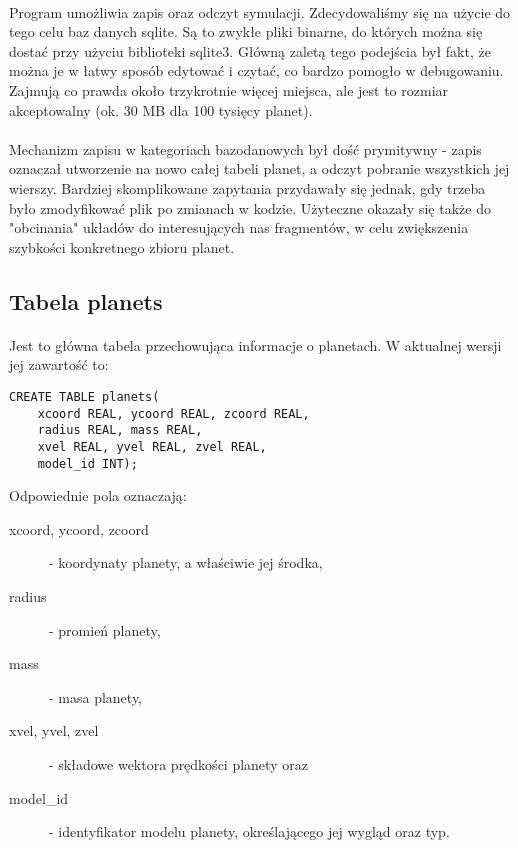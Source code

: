 \paragraph{}
Program umożliwia zapis oraz odczyt symulacji. Zdecydowaliśmy się na użycie do tego celu baz danych sqlite. Są to zwykłe pliki binarne, do których można się dostać przy użyciu biblioteki sqlite3\cite{sqlite3}. Główną zaletą tego podejścia był fakt, że można je w łatwy sposób edytować i czytać, co bardzo pomogło w debugowaniu. Zajmują co prawda około trzykrotnie więcej miejsca, ale jest to rozmiar akceptowalny (ok. 30 MB dla 100 tysięcy planet).

\paragraph{}
Mechanizm zapisu w kategoriach bazodanowych był dość prymitywny - zapis oznaczał utworzenie na nowo całej tabeli planet, a odczyt pobranie wszystkich jej wierszy. Bardziej skomplikowane zapytania przydawały się jednak, gdy trzeba było zmodyfikować plik po zmianach w kodzie. Użyteczne okazały się także do "obcinania" układów do interesujących nas fragmentów, w celu zwiększenia szybkości konkretnego zbioru planet.

\subsection{Tabela planets}
\paragraph{}
Jest to główna tabela przechowująca informacje o planetach. W aktualnej wersji jej zawartość to:
\begin{verbatim}
CREATE TABLE planets(
	xcoord REAL, ycoord REAL, zcoord REAL,
	radius REAL, mass REAL,
	xvel REAL, yvel REAL, zvel REAL,
	model_id INT);
\end{verbatim}

Odpowiednie pola oznaczają:
\begin{description}
\item[xcoord, ycoord, zcoord] - koordynaty planety, a właściwie jej środka,
\item[radius] - promień planety,
\item[mass] - masa planety,
\item[xvel, yvel, zvel] - składowe wektora prędkości planety oraz
\item[model\_id] - identyfikator modelu planety, określającego jej wygląd oraz typ.
\end{description}


